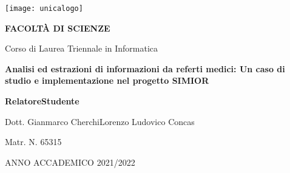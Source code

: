 \begin{spacing}{0.90}
\begin{center}
{\Large \thispagestyle{empty}}{\texttt{[image: unicalogo]}}\par
\end{center}
\end{spacing}

\noindent 
\begin{center}
\vspace{0.7cm}
\textbf{}\par
\end{center}{\LARGE \par}

\noindent 
\begin{center}
\textbf{\large FACOLT\`A DI SCIENZE}\par
\end{center}{\large \par}

\noindent
\begin{center}
{\large Corso di Laurea Triennale in Informatica}\par  %
\end{center}{\large \par}

\vspace{2.6cm}


\begin{center}
\textbf{\LARGE Analisi ed estrazioni di informazioni da referti medici:
Un caso di studio e implementazione nel progetto
SIMIOR}\par
\end{center}{\LARGE \par}



\begin{spacing}{0.90}
\vspace{3.7cm}
\textbf{\large Relatore}{\large \hfill{}}\textbf{\large Studente}{\large \par}
\end{spacing}

{\large Dott. Gianmarco Cherchi\hfill{}Lorenzo Ludovico Concas~}{\large \par}

\begin{spacing}{0.90}
{\large \hfill{}Matr. N. 65315}{\large \par}
\end{spacing}

\vspace{2.5cm}


\begin{center}
ANNO ACCADEMICO 2021/2022\par 
\end{center}